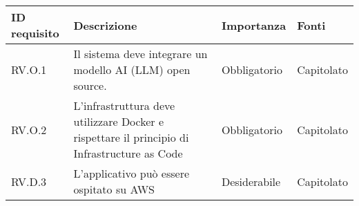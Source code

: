\begin{table}[H]
     \begin{tabular}{|C{2.7cm}|L{7.2cm}|C{2.7cm}|C{2cm}|}
        \hline
    \textbf{ID requisito} & \textbf{Descrizione} & \textbf{Importanza} & \textbf{Fonti}  \\
    \hline
           RV.O.1 & Il sistema deve integrare un modello AI (LLM) open source. & Obbligatorio & Capitolato \\
          \hline 
          RV.O.2 & L'infrastruttura deve utilizzare Docker e rispettare il principio di Infrastructure as Code & Obbligatorio & Capitolato \\
          RV.D.3 & L'applicativo può essere ospitato su AWS & Desiderabile & Capitolato \\
          \hline
    \end{tabular}

\end{table}